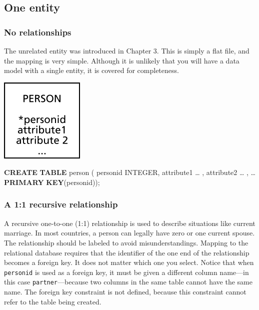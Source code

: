 \documentclass[
]{article}
\newenvironment{Shaded}{\begin{snugshade}}{\end{snugshade}}
\newcommand{\DataTypeTok}[1]{\textcolor[rgb]{0.13,0.29,0.53}{#1}}
\newcommand{\KeywordTok}[1]{\textcolor[rgb]{0.13,0.29,0.53}{\textbf{#1}}}
\newcommand{\NormalTok}[1]{#1}
\begin{document}
\hypertarget{one-entity}{%
\subsection*{One entity}\label{one-entity}}

\hypertarget{no-relationships}{%
\subsubsection*{No relationships}\label{no-relationships}}

The unrelated entity was introduced in Chapter 3. This is simply a flat
file, and the mapping is very simple. Although it is unlikely that you
will have a data model with a single entity, it is covered for
completeness.

\includegraphics[width=1.58333in,height=\textheight]{Figures/Reference 1/r1-person.png}

\begin{Shaded}
\begin{Highlighting}[]
\KeywordTok{CREATE} \KeywordTok{TABLE}\NormalTok{ person (}
\NormalTok{    personid        }\DataTypeTok{INTEGER}\NormalTok{,}
\NormalTok{    attribute1      … ,}
\NormalTok{    attribute2      … ,}
\NormalTok{    …}
        \KeywordTok{PRIMARY} \KeywordTok{KEY}\NormalTok{(personid));}
\end{Highlighting}
\end{Shaded}

\hypertarget{a-11-recursive-relationship}{%
\subsubsection*{A 1:1 recursive relationship}\label{a-11-recursive-relationship}}

A recursive one-to-one (1:1) relationship is used to describe situations
like current marriage. In most countries, a person can legally have zero
or one current spouse. The relationship should be labeled to avoid
misunderstandings. Mapping to the relational database requires that the
identifier of the one end of the relationship becomes a foreign key. It
does not matter which one you select. Notice that when \texttt{personid} is
used as a foreign key, it must be given a different column name---in
this case \texttt{partner}---because two columns in the same table cannot have
the same name. The foreign key constraint is not defined, because this
constraint cannot refer to the table being created.
\end{document}
